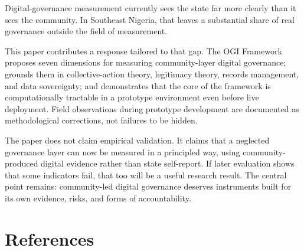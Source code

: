 \documentclass[sigconf,anonymous]{acmart}
\begin{document}
Digital-governance measurement currently sees the state far more clearly than it sees the community. In Southeast Nigeria, that leaves a substantial share of real governance outside the field of measurement.

This paper contributes a response tailored to that gap. The OGI Framework proposes seven dimensions for measuring community-layer digital governance; grounds them in collective-action theory, legitimacy theory, records management, and data sovereignty; and demonstrates that the core of the framework is computationally tractable in a prototype environment even before live deployment. Field observations during prototype development are documented as methodological corrections, not failures to be hidden.

The paper does not claim empirical validation. It claims that a neglected governance layer can now be measured in a principled way, using community-produced digital evidence rather than state self-report. If later evaluation shows that some indicators fail, that too will be a useful research result. The central point remains: community-led digital governance deserves instruments built for its own evidence, risks, and forms of accountability.

\section*{References}
\end{document}
